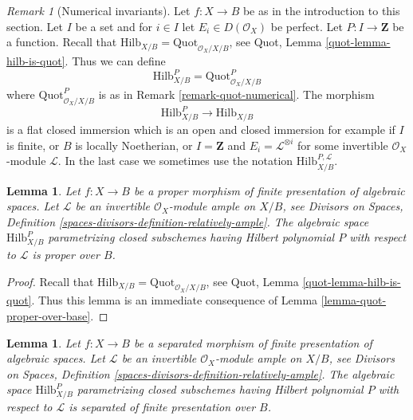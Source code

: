 \documentclass{stacks-project}
\theoremstyle{plain}
\newtheorem{lemma}[subsection]{Lemma}
\theoremstyle{definition}
\theoremstyle{remark}
\newtheorem{remark}[subsection]{Remark}
\numberwithin{equation}{subsection}
\def\Quotfunctor{\mathrm{Quot}}
\def\Hilbfunctor{\mathrm{Hilb}}
\begin{document}
\begin{remark}[Numerical invariants]
\label{remark-hilb-numerical}
Let $f : X \to B$ be as in the introduction to this section.
Let $I$ be a set and for $i \in I$ let $E_i \in D(\mathcal{O}_X)$ be perfect.
Let $P : I \to \mathbf{Z}$ be a function. Recall that
$\Hilbfunctor_{X/B} = \Quotfunctor_{\mathcal{O}_X/X/B}$, see
Quot, Lemma \ref{quot-lemma-hilb-is-quot}.
Thus we can define
$$
\Hilbfunctor^P_{X/B} = \Quotfunctor^P_{\mathcal{O}_X/X/B}
$$
where $\Quotfunctor^P_{\mathcal{O}_X/X/B}$ is as in
Remark \ref{remark-quot-numerical}. The morphism
$$
\Hilbfunctor^P_{X/B} \longrightarrow \Hilbfunctor_{X/B}
$$
is a flat closed immersion which is an open and closed immersion
for example if $I$ is finite, or $B$ is locally Noetherian, or
$I = \mathbf{Z}$ and $E_i = \mathcal{L}^{\otimes i}$ for some
invertible $\mathcal{O}_X$-module $\mathcal{L}$. In the last case
we sometimes use the notation $\Hilbfunctor^{P, \mathcal{L}}_{X/B}$.
\end{remark}

\begin{lemma}
\label{lemma-hilb-proper-over-base}
Let $f : X \to B$ be a proper morphism of finite presentation
of algebraic spaces. Let $\mathcal{L}$ be an invertible
$\mathcal{O}_X$-module ample on $X/B$, see
Divisors on Spaces, Definition
\ref{spaces-divisors-definition-relatively-ample}.
The algebraic space $\Hilbfunctor^P_{X/B}$
parametrizing closed subschemes
having Hilbert polynomial $P$ with respect to $\mathcal{L}$
is proper over $B$.
\end{lemma}

\begin{proof}
Recall that $\Hilbfunctor_{X/B} = \Quotfunctor_{\mathcal{O}_X/X/B}$, see
Quot, Lemma \ref{quot-lemma-hilb-is-quot}.
Thus this lemma is an immediate consequence of
Lemma \ref{lemma-quot-proper-over-base}.
\end{proof}

\begin{lemma}
\label{lemma-hilb-qc-over-base}
Let $f : X \to B$ be a separated morphism of finite presentation
of algebraic spaces. Let $\mathcal{L}$ be an invertible
$\mathcal{O}_X$-module ample on $X/B$, see
Divisors on Spaces, Definition
\ref{spaces-divisors-definition-relatively-ample}.
The algebraic space $\Hilbfunctor^P_{X/B}$
parametrizing closed subschemes
having Hilbert polynomial $P$ with respect to $\mathcal{L}$
is separated of finite presentation over $B$.
\end{lemma}
\end{document}
